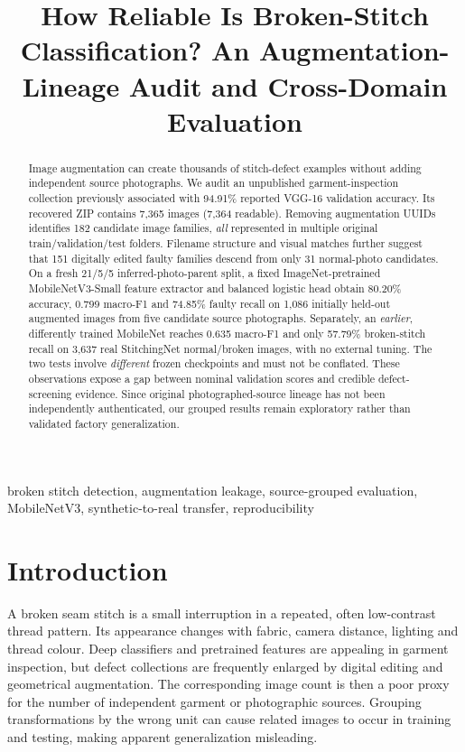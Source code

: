 \documentclass[conference,a4paper]{IEEEtran}
\begin{document}
\title{How Reliable Is Broken-Stitch Classification? An Augmentation-Lineage Audit and Cross-Domain Evaluation}
\author{} %
\maketitle
\begin{abstract}
Image augmentation can create thousands of stitch-defect examples without adding independent source photographs. We audit an unpublished garment-inspection collection previously associated with 94.91\% reported VGG-16 validation accuracy. Its recovered ZIP contains 7,365 images (7,364 readable). Removing augmentation UUIDs identifies 182 candidate image families, \emph{all} represented in multiple original train/validation/test folders. Filename structure and visual matches further suggest that 151 digitally edited faulty families descend from only 31 normal-photo candidates. On a fresh 21/5/5 inferred-photo-parent split, a fixed ImageNet-pretrained MobileNetV3-Small feature extractor and balanced logistic head obtain 80.20\% accuracy, 0.799 macro-F1 and 74.85\% faulty recall on 1,086 initially held-out augmented images from five candidate source photographs. Separately, an \emph{earlier}, differently trained MobileNet reaches 0.635 macro-F1 and only 57.79\% broken-stitch recall on 3,637 real StitchingNet normal/broken images, with no external tuning. The two tests involve \emph{different} frozen checkpoints and must not be conflated. These observations expose a gap between nominal validation scores and credible defect-screening evidence. Since original photographed-source lineage has not been independently authenticated, our grouped results remain exploratory rather than validated factory generalization.
\end{abstract}
\begin{IEEEkeywords}
broken stitch detection, augmentation leakage, source-grouped evaluation, MobileNetV3, synthetic-to-real transfer, reproducibility
\end{IEEEkeywords}

\section{Introduction}
A broken seam stitch is a small interruption in a repeated, often low-contrast thread pattern. Its appearance changes with fabric, camera distance, lighting and thread colour. Deep classifiers and pretrained features are appealing in garment inspection, but defect collections are frequently enlarged by digital editing and geometrical augmentation. The corresponding image count is then a poor proxy for the number of independent garment or photographic sources. Grouping transformations by the wrong unit can cause related images to occur in training and testing, making apparent generalization misleading.
\end{document}
